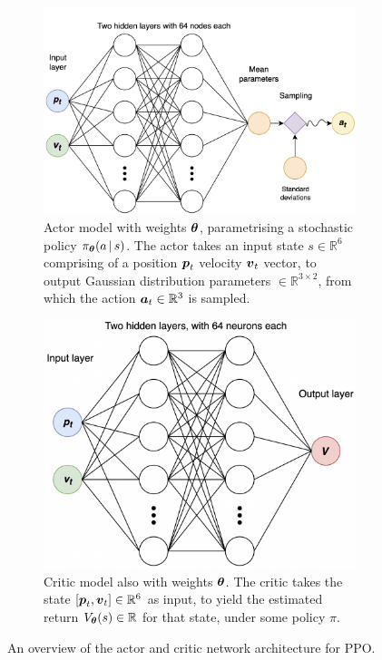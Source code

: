 \begin{figure}[hbt]
    \centering
        \begin{subfigure}[b]{.55\textwidth}
        \centering
        \includegraphics[width=.95\textwidth]{figures/4_/4_5_actor_ppo.drawio.png}
        \caption{Actor model with weights $\boldsymbol{\theta}$, parametrising a stochastic policy $\pi_{\boldsymbol{\theta}} (a \, | \, s)$. The actor takes an input state $s \in \mathbb{R}^6$ comprising of a \textcolor[HTML]{004CD9}{position} ${\boldsymbol{p}}_t$ \textcolor[HTML]{009900}{velocity} ${\boldsymbol{v}}_t$ vector, to output Gaussian distribution \textcolor[HTML]{DA8A67}{parameters} $\in \mathbb{R}^{3\times2}$, from which the \textcolor[HTML]{D6C415}{action} ${\boldsymbol{a}}_t \in \mathbb{R}^3$ is sampled.}
        \label{fig:4_5_PPOactor}
    \end{subfigure}
    \hfill
    \begin{subfigure}[b]{0.44\textwidth}
        \centering
        \includegraphics[width=.95\textwidth]{figures/4_/4_5_critic_ppo.drawio.png}
        \caption{Critic model also with weights $\boldsymbol{\theta}$. The critic takes the state $[{\boldsymbol{p}}_t, {\boldsymbol{v}}_t] \in \mathbb{R}^6$ as input, to yield the \textcolor[HTML]{CC262A}{estimated return} $V_{\boldsymbol{\theta}} (s) \in \mathbb{R}$ for that state, under some policy $\pi$.}
        \label{fig:4_3_PPOcritic}
    \end{subfigure}
    \hfill
    \caption{An overview of the actor and critic network architecture for PPO.}
    \label{fig:4_3_PPOnetworkArchitecture}
\end{figure}

